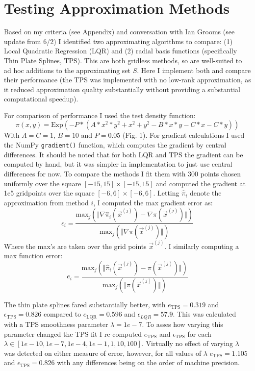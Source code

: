 \documentclass[12pt,a4paper]{article}
\begin{document}
\section{Testing Approximation Methods}
Based on my criteria (see Appendix) and conversation with Ian Grooms (see update from 6/2) I identified two approximating algorithms to compare: (1) Local Quadratic Regression (LQR) and (2) radial basis functions (specifically Thin Plate Splines, TPS).  This are both gridless methods, so are well-suited to ad hoc additions to the approximating set $S$.  Here I implement both and compare their performance (the TPS was implemented with no low-rank approximation, as it reduced approximation quality substantially without providing a substantial computational speedup).

For comparison of performance I used the test density function:
\begin{equation}
\pi(x,y) = \text{Exp} \left( -P*(A*x^2*y^2 + x^2 + y^2 - B*x*y - C*x - C*y) \right)
\end{equation}
With $A = C = 1$, $ B =10$ and $ P = 0.05$ (Fig. 1).  For gradient calculations I used the NumPy \texttt{gradient()} function, which computes the gradient by central differences.  It should be noted that for both LQR and TPS the gradient can be computed by hand, but it was simpler in implementation to just use central differences for now.  To compare the methods I fit them with 300 points chosen uniformly over the square $[-15,15] \times [-15,15]$ and computed the gradient at 1e5 gridpoints over the square $[-6,6] \times [-6,6]$.  Letting $\hat{\pi}_i$ denote the approximation from method $i$, I computed the max gradient error as:
\[
\epsilon_i = \frac{ \text{max}_{j} \left( \Vert \nabla \hat{\pi}_i(\vec{x}^{(j)}) - \nabla \pi(\vec{x}^{(j)})  \Vert \right) } { \text{max}_j \left( \Vert \nabla \pi(\vec{x}^{(j)}) \Vert \right) }
\]
Where the max's are taken over the grid points $\vec{x}^{(j)}$. I similarly computing a max function error:
\[
e_i = \frac{ \text{max}_{j} \left( \Vert \hat{\pi}_i(\vec{x}^{(j)}) - \pi(\vec{x}^{(j)})  \Vert \right) } { \text{max}_j \left( \Vert \pi(\vec{x}^{(j)}) \Vert \right) }
\]

The thin plate splines fared substantially better, with $e_{\text{TPS}} = 0.319$ and $\epsilon_{\text{TPS}} = 0.826$ compared to $e_{\text{LQR}} = 0.596$ and $\epsilon_{LQR} = 57.9$.  This was calculated with a TPS smoothness parameter $\lambda = 1e-7$.  To asses how varying this parameter changed the TPS fit I re-computed $e_{\text{TPS}}$ and $\epsilon_{\text{TPS}}$ for each $\lambda \in [1e-10, 1e-7,1e-4, 1e-1, 1, 10, 100]$.  Virtually no effect of varying $\lambda$ was detected on either measure of error, however, for all values of $\lambda$ $e_\text{TPS} = 1.105$ and $\epsilon_\text{TPS} = 0.826$ with any differences being on the order of machine precision.
\end{document}
